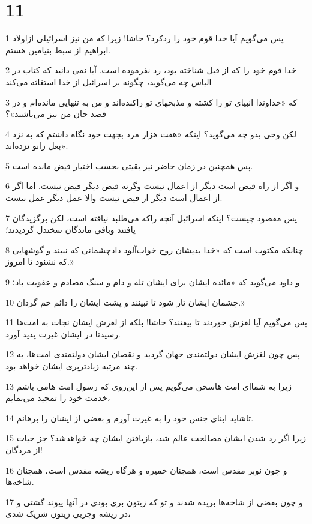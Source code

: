 \chapter{11}

\par 1 پس می‌گویم آیا خدا قوم خود را ردکرد؟ حاشا! زیرا که من نیز اسرائیلی ازاولاد ابراهیم از سبط بنیامین هستم.
\par 2 خدا قوم خود را که از قبل شناخته بود، رد نفرموده است. آیا نمی دانید که کتاب در الیاس چه می‌گوید، چگونه بر اسرائیل از خدا استغاثه می‌کند
\par 3 که «خداوندا انبیای تو را کشته و مذبحهای تو راکنده‌اند و من به تنهایی مانده‌ام و در قصد جان من نیز می‌باشند»؟
\par 4 لکن وحی بدو چه می‌گوید؟ اینکه «هفت هزار مرد بجهت خود نگاه داشتم که به نزد بعل زانو نزده‌اند».
\par 5 پس همچنین در زمان حاضر نیز بقیتی بحسب اختیار فیض مانده است.
\par 6 و اگر از راه فیض است دیگر از اعمال نیست وگرنه فیض دیگر فیض نیست. اما اگر از اعمال است دیگر از فیض نیست والا عمل دیگر عمل نیست.
\par 7 پس مقصود چیست؟ اینکه اسرائیل آنچه راکه می‌طلبد نیافته است، لکن برگزیدگان یافتند وباقی ماندگان سختدل گردیدند؛
\par 8 چنانکه مکتوب است که «خدا بدیشان روح خواب‌آلود دادچشمانی که نبیند و گوشهایی که نشنود تا امروز.»
\par 9 و داود می‌گوید که «مائده ایشان برای ایشان تله و دام و سنگ مصادم و عقوبت باد؛
\par 10 چشمان ایشان تار شود تا نبینند و پشت ایشان را دائم خم گردان.»
\par 11 پس می‌گویم آیا لغزش خوردند تا بیفتند؟ حاشا! بلکه از لغزش ایشان نجات به امت‌ها رسیدتا در ایشان غیرت پدید آورد.
\par 12 پس چون لغزش ایشان دولتمندی جهان گردید و نقصان ایشان دولتمندی امت‌ها، به چند مرتبه زیادترپری ایشان خواهد بود.
\par 13 زیرا به شما‌ای امت هاسخن می‌گویم پس از این‌روی که رسول امت هامی باشم خدمت خود را تمجید می‌نمایم،
\par 14 تاشاید ابنای جنس خود را به غیرت آورم و بعضی از ایشان را برهانم.
\par 15 زیرا اگر رد شدن ایشان مصالحت عالم شد، باز‌یافتن ایشان چه خواهدشد؟ جز حیات از مردگان!
\par 16 و چون نوبر مقدس است، همچنان خمیره و هرگاه ریشه مقدس است، همچنان شاخه‌ها.
\par 17 و چون بعضی از شاخه‌ها بریده شدند و تو که زیتون بری بودی در آنها پیوند گشتی و در ریشه وچربی زیتون شریک شدی،
